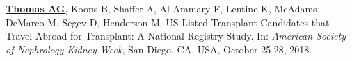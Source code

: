 \documentclass[10pt]{article}
\makeatletter
\newlength{\bibhang}
\newlength{\bibsep}
 {\@listi \global\bibsep\itemsep \global\advance\bibsep by\parsep}
\newenvironment{bibenum*}
  {\renewcommand\labelenumi{[\theenumi]}%
   \etaremune[
     topsep=0pt,
     itemsep=\bibsep,
     parsep=0pt,partopsep=0pt,
     itemindent=-\bibhang,
     leftmargin={\bibhang+\widthof{[999]}}]}
  {\endetaremune}
\makeatother
\begin{document}
\begin{bibenum*}





\item \underline{\textbf{Thomas AG}}, Koons B, Shaffer A, Al Ammary F,
  Lentine K, McAdams-DeMarco M, Segev D, Henderson M.
  US-Listed Transplant Candidates that Travel Abroad for Transplant:
  A National Registry Study.
  In: \emph{American Society of Nephrology Kidney Week},
  San Diego, CA, USA, October 25-28, 2018.



\end{bibenum*}
\end{document}
